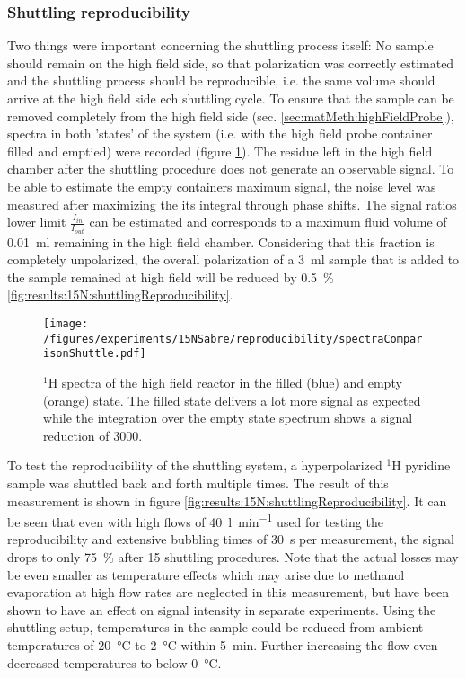         \subsubsection{Shuttling reproducibility}
            \label{results:15N:shuttlingReproducibility}
            Two things were important concerning the shuttling process itself: No sample should remain on the high field side, so that polarization was correctly estimated and the shuttling process should be reproducible, i.e. the same volume should arrive at the high field side ech shuttling cycle.
            To ensure that the sample can be removed completely from the high field side (sec. \ref{sec:matMeth:highFieldProbe}), spectra in both 'states' of the system (i.e. with the high field probe container filled and emptied) were recorded (figure \ref{fig:results:15N:shuttlingRemoval}). The residue left in the high field chamber after the shuttling procedure does not generate an observable signal. To be able to estimate the empty containers maximum signal, the noise level was measured after maximizing the its integral through phase shifts. The signal ratios lower limit $\frac{I_{in}}{I_{out}}$ can be estimated and corresponds to a maximum fluid volume of \SI{0.01}{ml} remaining in the high field chamber. Considering that this fraction is completely unpolarized, the overall polarization of a \SI{3}{ml} sample that is added to the sample remained at high field  will be reduced by \SI{0.5}{\percent} \ref{fig:results:15N:shuttlingReproducibility}.
            \begin{figure}
                \centering
                \texttt{[image: /figures/experiments/15NSabre/reproducibility/spectraComparisonShuttle.pdf]}
                \caption[High field removal efficiency]{$^1$H spectra of the high field reactor in the filled (blue) and empty (orange) state. The filled state delivers a lot more signal as expected while the integration over the empty state spectrum shows a signal reduction of 3000.}
                \label{fig:results:15N:shuttlingRemoval}
            \end{figure}
            To test the reproducibility of the shuttling system, a hyperpolarized $^{1}$H pyridine sample was shuttled back and forth multiple times. The result of this measurement is shown in figure \ref{fig:results:15N:shuttlingReproducibility}. It can be seen that even with high flows of \SI{40}{\litre\per\minute} used for testing the reproducibility and extensive bubbling times of \SI{30}{\second} per measurement, the signal drops to only \SI{75}{\percent} after 15 shuttling procedures. Note that the actual losses may be even smaller as temperature effects which may arise due to methanol evaporation at high flow rates are neglected in this measurement, but have been shown to have an effect on signal intensity in separate experiments. Using the shuttling setup, temperatures in the sample could be reduced from ambient temperatures of \SI{20}{\celsius} to \SI{2}{\celsius} within \SI{5}{\minute}. Further increasing the flow even decreased temperatures to below \SI{0}{\celsius}.

